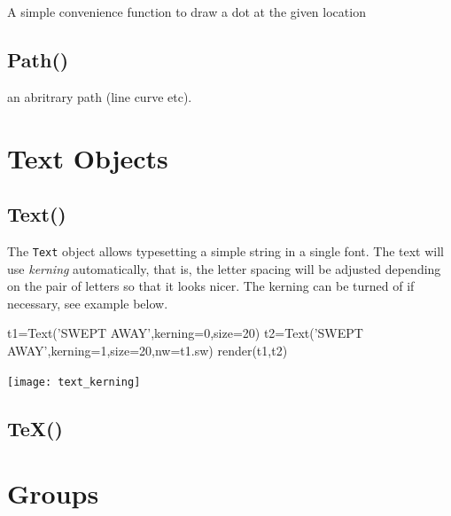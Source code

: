 \documentclass[a4paper]{book}
\begin{document}
A simple convenience function to draw a dot at the given location

\subsection{Path()}
\label{sec:path}

an abritrary path (line curve etc).

\section{Text Objects}

\subsection{Text()}
\label{sec:text}
The \Verb|Text| object allows typesetting a simple string in a single
font.  The text will use \emph{kerning} automatically, that is, the
letter spacing will be adjusted depending on the pair of letters so
that it looks nicer. The kerning can be turned of if necessary, see
example below.
\begin{example}
\begin{python}
t1=Text('SWEPT AWAY',kerning=0,size=20)
t2=Text('SWEPT AWAY',kerning=1,size=20,nw=t1.sw)
render(t1,t2)
\end{python}
\begin{center}
  \texttt{[image: text\_kerning]}
\end{center}
\end{example}

\subsection{TeX()}
\label{sec:tex}

\section{Groups}
\end{document}
